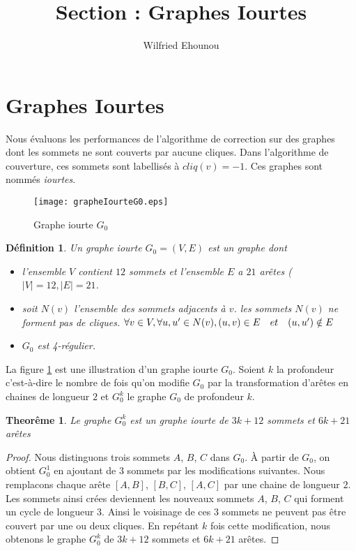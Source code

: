 \documentclass[onecolumn, 12pt]{book}
\title{Section : Graphes Iourtes}
\author{Wilfried Ehounou}
\date{\oldstylenums{\today}}
\newtheorem{definition}{D\'efinition}
\newtheorem{theorem}{Theor\^eme}
\begin{document}
\maketitle
\tableofcontents

\section{Graphes Iourtes}
Nous \'evaluons les performances de l'algorithme de correction sur des graphes dont les sommets ne sont couverts par aucune cliques. Dans l'algorithme de couverture, ces sommets sont labellis\'es \`a $cliq(v) = -1$. Ces graphes sont nomm\'es {\em iourtes}.

\begin{figure}[htb!] 
\centering
\texttt{[image: grapheIourteG0.eps]}
\caption{Graphe iourte $G_0 $}
\label{grapheIourteG0} 
\end{figure}

\begin{definition}
Un graphe iourte $G_0 = (V, E)$ est un graphe dont
\begin{itemize}
	\item l'ensemble $V$ contient $12$ sommets et l'ensemble $E$ a $21$ ar\^etes ($|V| = 12, |E| = 21$.
	\item soit $N(v)$ l'ensemble des sommets adjacents \`a $v$. 
		les sommets $N(v)$ ne forment pas de cliques. \newline
		$\forall v \in V, \forall u, u' \in N(v),  (u, v) \in E \hspace{1 em} et  \hspace{1 em} (u, u') \notin E $
	\item $G_0$ est {\em 4-r\'egulier}.
\end{itemize}
\end{definition}
La figure \ref{grapheIourteG0} est une illustration d'un graphe iourte $G_0$.
\newline
Soient $k$ la profondeur c'est-\`a-dire le nombre de fois qu'on modifie $G_0$ par la transformation d'ar\^etes en chaines de longueur $2$ et $G_0^k$ le graphe $G_0$ de profondeur $k$.

\begin{theorem}
Le graphe $G_0^k$ est un graphe iourte de $3k+12$ sommets et $6k + 21$ ar\^etes
\end{theorem} 

\begin{proof}
Nous distinguons trois sommets $A$, $B$, $C$ dans $G_0$. 
\`A partir de $G_0$, on obtient $G_0^1$ en ajoutant de $3$ sommets par les modifications  suivantes.
Nous remplacons chaque ar\^ete $[A,B]$, $[B,C]$,  $[A,C]$  par une chaine de longueur $2$. 
Les sommets ainsi cr\'ees deviennent les nouveaux sommets   $A$, $B$, $C$ qui forment un cycle de longueur $3$.
Ainsi le voisinage de ces $3$ sommets  ne peuvent pas \^etre couvert par une ou deux cliques.
En rep\'etant $k$ fois cette modification, nous obtenons le graphe $G_0^k$ de $3k+12$ sommets et $6k+21$ ar\^etes.
\end{proof}
\end{document}
